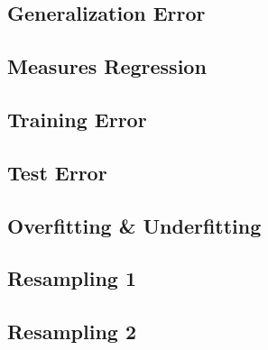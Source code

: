


\subsection{Generalization Error}


\subsection{Measures Regression}


\subsection{Training Error}


\subsection{Test Error}


\subsection{Overfitting \& Underfitting}


\subsection{Resampling 1}


\subsection{Resampling 2}


